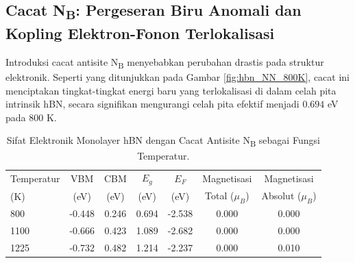\subsection{Cacat N\textsubscript{B}: Pergeseran Biru Anomali dan Kopling Elektron-Fonon Terlokalisasi}
\label{subsec:hbn_defek_nb}
Introduksi cacat antisite N\textsubscript{B} menyebabkan perubahan drastis pada struktur elektronik.
Seperti yang ditunjukkan pada Gambar \ref{fig:hbn_NN_800K}, cacat ini menciptakan tingkat-tingkat energi baru yang terlokalisasi di dalam celah pita intrinsik hBN, secara signifikan mengurangi celah pita efektif menjadi $0.694$ eV pada 800 K.
\begin{table}[htbp!] %
  \centering
  \caption{Sifat Elektronik Monolayer hBN dengan Cacat Antisite N\textsubscript{B} sebagai Fungsi Temperatur.}
  \label{tab:hbn_defek_nb}
  \begin{tabular}{lcccccc}
    \toprule
    Temperatur & VBM & CBM & $E_g$ & $E_F$ & Magnetisasi & Magnetisasi \\
    (K) & (eV) & (eV) & (eV) & (eV) & Total ($\mu_B$) & Absolut ($\mu_B$) \\
    \midrule
    800  & -0.448 &  0.246 & 0.694 & -2.538 & 0.000 & 0.000 \\
    1100 & -0.666 &  0.423 & 1.089 & -2.682 & 0.000 & 0.000 \\
    1225 & -0.732 &  0.482 & 1.214 & -2.237 & 0.000 & 0.010 \\
    \bottomrule
  \end{tabular}
\end{table}

